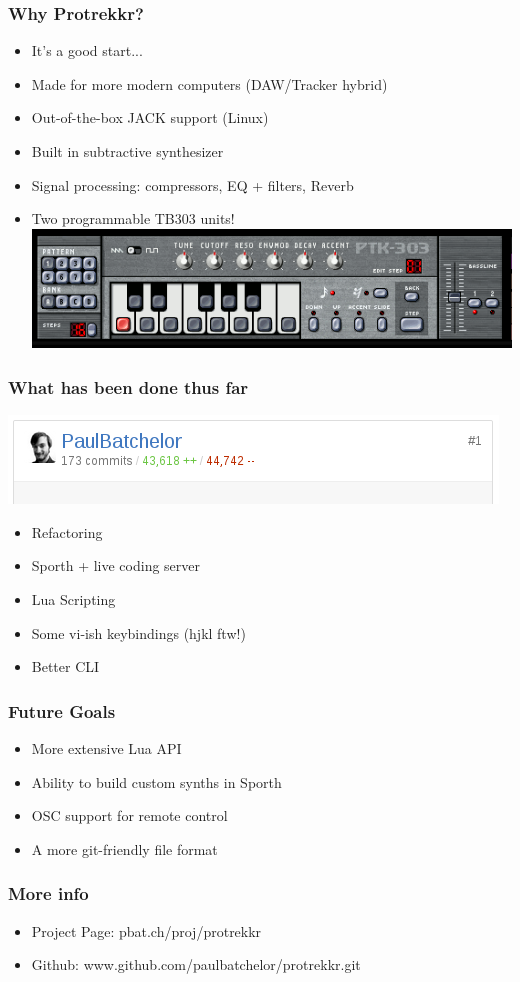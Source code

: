 \documentclass{beamer}
\begin{document}
\begin{frame}
\frametitle{Why Protrekkr?}
\begin{itemize}
    \item{It's a good start...}
    \item{Made for more modern computers (DAW/Tracker hybrid)}
    \item{Out-of-the-box JACK support (Linux)}
    \item{Built in subtractive synthesizer}
    \item{Signal processing: compressors, EQ + filters, Reverb}
    \item{Two programmable TB303 units!  \break \break
        \includegraphics[scale=0.3]{tb303}
    }
\end{itemize}

\end{frame}

\begin{frame}
\frametitle{What has been done thus far}
\includegraphics[scale=0.4]{git}
\begin{itemize}
    \item{Refactoring}
    \item{Sporth + live coding server}
    \item{Lua Scripting}
    \item{Some vi-ish keybindings (hjkl ftw!)}
    \item{Better CLI}
\end{itemize}
\end{frame}

\begin{frame}
\frametitle{Future Goals}
\begin{itemize}
    \item{More extensive Lua API}
    \item{Ability to build custom synths in Sporth}
    \item{OSC support for remote control}
    \item{A more git-friendly file format}
\end{itemize}
\end{frame}

\begin{frame}
\frametitle{More info}
\begin{itemize}
    \item{Project Page: pbat.ch/proj/protrekkr}
    \item{Github: www.github.com/paulbatchelor/protrekkr.git}
\end{itemize}
\end{frame}
\end{document}
